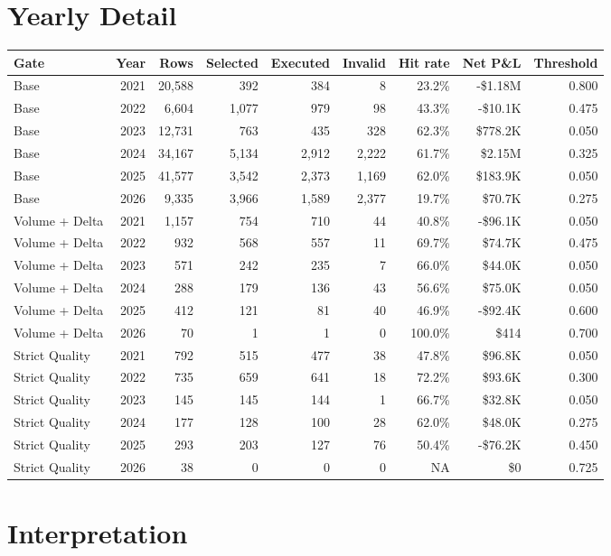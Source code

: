 \documentclass[11pt]{article}
\begin{document}
\section{Yearly Detail}
\begin{tabular}{lrrrrrrrr}
\toprule
Gate & Year & Rows & Selected & Executed & Invalid & Hit rate & Net P\&L & Threshold \\
\midrule
Base & 2021 & 20,588 & 392 & 384 & 8 & 23.2\% & -\$1.18M & 0.800 \\
Base & 2022 & 6,604 & 1,077 & 979 & 98 & 43.3\% & -\$10.1K & 0.475 \\
Base & 2023 & 12,731 & 763 & 435 & 328 & 62.3\% & \$778.2K & 0.050 \\
Base & 2024 & 34,167 & 5,134 & 2,912 & 2,222 & 61.7\% & \$2.15M & 0.325 \\
Base & 2025 & 41,577 & 3,542 & 2,373 & 1,169 & 62.0\% & \$183.9K & 0.050 \\
Base & 2026 & 9,335 & 3,966 & 1,589 & 2,377 & 19.7\% & \$70.7K & 0.275 \\
Volume + Delta & 2021 & 1,157 & 754 & 710 & 44 & 40.8\% & -\$96.1K & 0.050 \\
Volume + Delta & 2022 & 932 & 568 & 557 & 11 & 69.7\% & \$74.7K & 0.475 \\
Volume + Delta & 2023 & 571 & 242 & 235 & 7 & 66.0\% & \$44.0K & 0.050 \\
Volume + Delta & 2024 & 288 & 179 & 136 & 43 & 56.6\% & \$75.0K & 0.050 \\
Volume + Delta & 2025 & 412 & 121 & 81 & 40 & 46.9\% & -\$92.4K & 0.600 \\
Volume + Delta & 2026 & 70 & 1 & 1 & 0 & 100.0\% & \$414 & 0.700 \\
Strict Quality & 2021 & 792 & 515 & 477 & 38 & 47.8\% & \$96.8K & 0.050 \\
Strict Quality & 2022 & 735 & 659 & 641 & 18 & 72.2\% & \$93.6K & 0.300 \\
Strict Quality & 2023 & 145 & 145 & 144 & 1 & 66.7\% & \$32.8K & 0.050 \\
Strict Quality & 2024 & 177 & 128 & 100 & 28 & 62.0\% & \$48.0K & 0.275 \\
Strict Quality & 2025 & 293 & 203 & 127 & 76 & 50.4\% & -\$76.2K & 0.450 \\
Strict Quality & 2026 & 38 & 0 & 0 & 0 & NA & \$0 & 0.725 \\
\bottomrule
\end{tabular}

\section{Interpretation}
\end{document}
